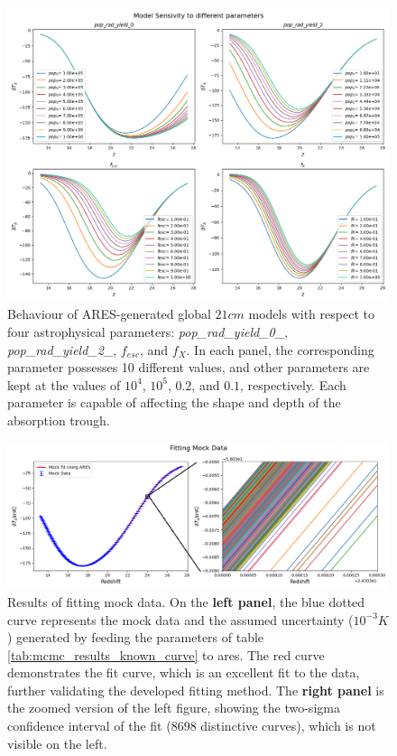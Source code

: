 \documentclass[12pt, TexShade, letterpaper]{report}
\begin{document}
\begin{figure}[h!]
\centering
\includegraphics[scale =0.5]{sensivity.png}
\caption[Behaviour of global $21cm$ theoretical model with respect to underlying astrophysical parameters]{Behaviour of ARES-generated global $21cm$ models with respect to four astrophysical parameters: \emph{pop\_rad\_yield\_0\_}, \emph{pop\_rad\_yield\_2\_}, $f_{esc}$, and $f_X$. In each panel, the corresponding parameter possesses 10 different values, and other parameters are kept at the values of  $10^4$, $10^5$, $0.2$, and $0.1$, respectively. Each parameter is capable of affecting the shape and depth of the absorption trough.}
\label{fig:sensivity}
\end{figure}
\begin{figure}[h!]
\centering
\includegraphics[scale =0.7]{fit_curve_mock.png}
\caption[Results of fitting mock data]{Results of fitting mock data. On the \textbf{left panel}, the blue dotted curve represents the mock data and the assumed uncertainty ($10^{-3}K$) generated by feeding the parameters of table \ref{tab:mcmc_results_known_curve} to \gls{ares}. The red curve demonstrates the fit curve, which is an excellent fit to the data, further validating the developed fitting method. The \textbf{right panel} is the zoomed version of the left figure, showing the two-sigma confidence interval of the fit (8698 distinctive curves), which is not visible on the left.}
\label{fig:fit_curve_known_curve}
\end{figure}
\end{document}
